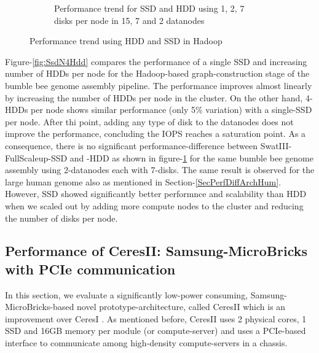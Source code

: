 \documentclass[conference]{IEEEtran}
\begin{document}
\begin{figure}[h]
\begin{subfigure}[b]{0.23\textwidth}
          \caption{Performance trend for SSD and HDD using 1, 2, 7 disks per node in 15, 7 and 2 datanodes}
          \label{fig:SsdNHddDiffNodes}
  \end{subfigure}
  \caption{Performance trend using HDD and SSD in Hadoop}
  \label{fig:SsdNHdd}
\end{figure}

Figure-\ref{fig:SsdN4Hdd} compares the performance of a single SSD and  increasing number of HDDs per node for the Hadoop-based graph-construction stage of the bumble bee genome assembly pipeline.
The performance improves almost linearly by increasing the number of HDDs per node in the cluster.
On the other hand, 4-HDDs per node shows similar performance (only 5\% variation) with a single-SSD per node.
After thi point, adding any type of disk to the datanodes does not improve the performance, concluding the IOPS reaches a saturation point.
As a consequence, there is no significant performance-difference between SwatIII-FullScaleup-SSD and -HDD as shown in figure-\ref{fig:SsdNHddDiffNodes} for the same bumble bee genome assembly using 2-datanodes each with 7-disks. The same result is observed for the large human genome also as mentioned in Section-\ref{SecPerfDiffArchHum}.
However, SSD showed significantly better performnce and scalability than HDD when we scaled out by adding more compute nodes to the cluster and reducing the number of disks per node.

\subsection {Performance of CeresII: Samsung-MicroBricks with PCIe communication} \label{CeresII:Scaledout-in-a-boxAndSSD}
In this section, we evaluate a significantly low-power consuming, Samsung-MicroBricks-based novel prototype-architecture, called CeresII which is an improvement over CeresI \cite{Cluster:ceres1}. 
As mentioned before, CeresII uses 2 physical cores, 1 SSD and 16GB memory per module (or compute-server) and uses a PCIe-based interface to communicate among high-density compute-servers in a chassis.
\end{document}
